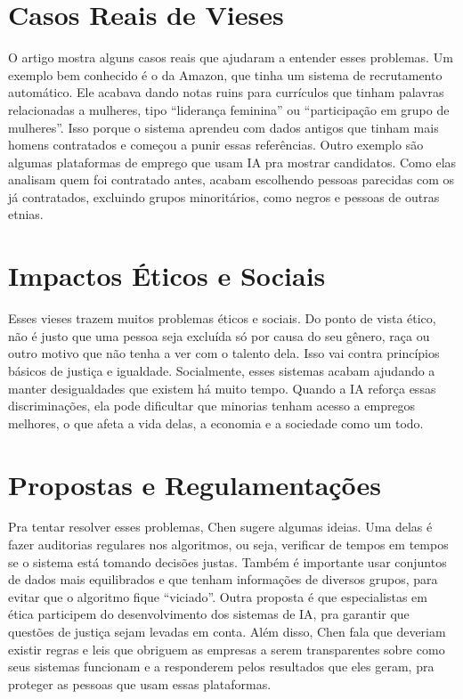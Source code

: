 \documentclass[english]{article}
\begin{document}
\section{Casos Reais de Vieses}
O artigo mostra alguns casos reais que ajudaram a entender esses problemas. Um exemplo bem conhecido é o da Amazon, que tinha um sistema de recrutamento automático. Ele acabava dando notas ruins para currículos que tinham palavras relacionadas a mulheres, tipo “liderança feminina” ou “participação em grupo de mulheres”. Isso porque o sistema aprendeu com dados antigos que tinham mais homens contratados e começou a punir essas referências. Outro exemplo são algumas plataformas de emprego que usam IA pra mostrar candidatos. Como elas analisam quem foi contratado antes, acabam escolhendo pessoas parecidas com os já contratados, excluindo grupos minoritários, como negros e pessoas de outras etnias.

\section{Impactos Éticos e Sociais}
Esses vieses trazem muitos problemas éticos e sociais. Do ponto de vista ético, não é justo que uma pessoa seja excluída só por causa do seu gênero, raça ou outro motivo que não tenha a ver com o talento dela. Isso vai contra princípios básicos de justiça e igualdade. Socialmente, esses sistemas acabam ajudando a manter desigualdades que existem há muito tempo. Quando a IA reforça essas discriminações, ela pode dificultar que minorias tenham acesso a empregos melhores, o que afeta a vida delas, a economia e a sociedade como um todo.

\section{Propostas e Regulamentações}
Pra tentar resolver esses problemas, Chen sugere algumas ideias. Uma delas é fazer auditorias regulares nos algoritmos, ou seja, verificar de tempos em tempos se o sistema está tomando decisões justas. Também é importante usar conjuntos de dados mais equilibrados e que tenham informações de diversos grupos, para evitar que o algoritmo fique “viciado”. Outra proposta é que especialistas em ética participem do desenvolvimento dos sistemas de IA, pra garantir que questões de justiça sejam levadas em conta. Além disso, Chen fala que deveriam existir regras e leis que obriguem as empresas a serem transparentes sobre como seus sistemas funcionam e a responderem pelos resultados que eles geram, pra proteger as pessoas que usam essas plataformas.
\end{document}

